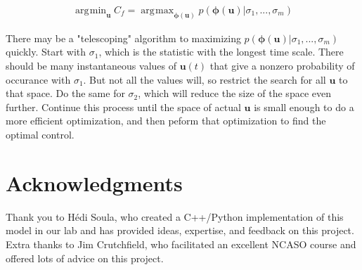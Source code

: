 \documentclass{article} %
\DeclareMathOperator*{\argmin}{\arg\!\min}
\DeclareMathOperator*{\argmax}{\arg\!\max}
\begin{document}
\begin{align*}
\argmin_{\bm{u}} C_f = \argmax_{\bm{\phi}(\bm{u})} p \left( \bm{\phi}(\bm{u}) | \sigma_1, ..., \sigma_m \right)
\end{align*}

There may be a "telescoping" algorithm to maximizing $p \left( \bm{\phi}(\bm{u}) | \sigma_1, ..., \sigma_m \right)$
quickly. Start with $\sigma_1$, which is the statistic with the longest time scale.
There should be many instantaneous values of $\bm{u}(t)$ that give a nonzero
probability of occurance with $\sigma_1$. But not all the values will, so restrict the
search for all $\bm{u}$ to that space. Do the same for $\sigma_2$, which will
reduce the size of the space even further. Continue this process until the space of
actual $\bm{u}$ is small enough to do a more efficient optimization, and then
peform that optimization to find the optimal control.
\fi


\section*{Acknowledgments}

Thank you to H\'{e}di Soula, who created a C++/Python implementation of this model in our lab
and has provided ideas, expertise, and feedback on this project. Extra thanks to Jim Crutchfield,
who facilitated an excellent NCASO course and offered lots of advice on this project.



\end{document}
